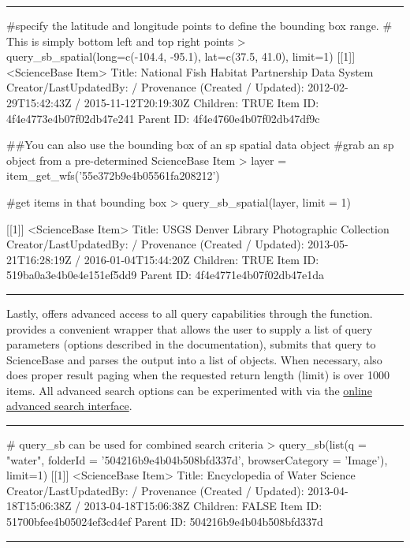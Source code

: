 \noindent\rule{\textwidth}{0.4pt}
\begin{example}
#specify the latitude and longitude points to define the bounding box range. 
# This is simply bottom left and top right points
> query_sb_spatial(long=c(-104.4, -95.1), lat=c(37.5, 41.0), limit=1)
[[1]]
<ScienceBase Item>
  Title: National Fish Habitat Partnership Data System
  Creator/LastUpdatedBy:      /
  Provenance (Created / Updated):  2012-02-29T15:42:43Z / 2015-11-12T20:19:30Z
  Children: TRUE
  Item ID: 4f4e4773e4b07f02db47e241
  Parent ID: 4f4e4760e4b07f02db47df9c

##You can also use the bounding box of an sp spatial data object
#grab an sp object from a pre-determined ScienceBase Item
> layer = item_get_wfs('55e372b9e4b05561fa208212')

#get items in that bounding box
> query_sb_spatial(layer, limit = 1)

[[1]]
<ScienceBase Item>
  Title: USGS Denver Library Photographic Collection
  Creator/LastUpdatedBy:      /
  Provenance (Created / Updated):  2013-05-21T16:28:19Z / 2016-01-04T15:44:20Z
  Children: TRUE
  Item ID: 519ba0a3e4b0e4e151ef5dd9
  Parent ID: 4f4e4771e4b07f02db47e1da
\end{example}
\noindent\rule{\textwidth}{0.4pt}

Lastly,  offers advanced access to all query capabilities through
the  function.  provides a convenient wrapper that 
allows the user to supply a list of query parameters (options described in the documentation),
submits that query to ScienceBase and parses the output
into a list of  objects. When necessary,  
also does proper result paging when the requested
return length (limit) is over 1000 items. All advanced search options can be experimented
with via the \href{https://www.sciencebase.gov/catalog/items/queryForm}
{online advanced search interface}.

\noindent\rule{\textwidth}{0.4pt}
\begin{example}

# query_sb can be used for combined search criteria
> query_sb(list(q = "water", folderId = '504216b9e4b04b508bfd337d', browserCategory = 'Image'), limit=1)
[[1]]
<ScienceBase Item>
  Title: Encyclopedia of Water Science
  Creator/LastUpdatedBy:      /
  Provenance (Created / Updated):  2013-04-18T15:06:38Z / 2013-04-18T15:06:38Z
  Children: FALSE
  Item ID: 51700bfee4b05024ef3cd4ef
  Parent ID: 504216b9e4b04b508bfd337d

\end{example}
\noindent\rule{\textwidth}{0.4pt}

